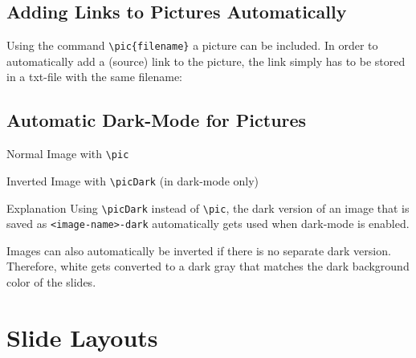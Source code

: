\documentclass[
	aspectratio=169, %
	8pt, %
]{beamer}
\begin{document}
\subsection{Adding Links to Pictures Automatically}
\begin{frame}{\insertsubsection}
	Using the command \texttt{\textbackslash pic\{filename\}} a picture can be included. In order to automatically add a (source) link to the picture, the link simply has to be stored in a txt-file with the same filename:

	\centering{} %
\end{frame}

\subsection{Automatic Dark-Mode for Pictures}
\begin{frame}{\insertsubsection}
	\begin{fancycolumns}
		\begin{notetight}{Normal Image with \texttt{\textbackslash pic}}
			\centering
		\end{notetight}
	\nextcolumn
		\begin{notetight}{Inverted Image with \texttt{\textbackslash picDark} (in dark-mode only)}
			\centering
		\end{notetight}
	\end{fancycolumns}
	\begin{note}{Explanation}
		Using \texttt{\textbackslash picDark} instead of \texttt{\textbackslash pic}, the dark version of an image that is saved as \texttt{<image-name>-dark} automatically gets used when dark-mode is enabled.

		Images can also automatically be inverted if there is no separate dark version. Therefore, white gets converted to a dark gray that matches the dark background color of the slides.
	\end{note}
\end{frame}

\section{Slide Layouts}
\end{document}
